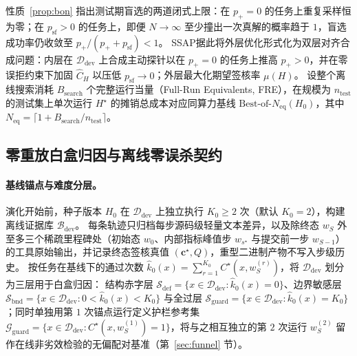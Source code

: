 \documentclass[UTF8,a4paper,10.5pt]{ctexart}
\newcommand{\method}{SSAP}
\newcommand{\Ddev}{\mathcal{D}_{\mathrm{dev}}}
\begin{document}
性质~\ref{prop:bon} 指出测试期盲选的两道闭式上限：在 $p_+=0$ 的任务上重复采样恒为零；在 $p_{\mathrm{sf}}>0$ 的任务上，即便 $N\to\infty$ 至少撞出一次真解的概率趋于 $1$，盲选成功率仍收敛至 $p_+/(p_++p_{\mathrm{sf}})<1$。
\method{}据此将外层优化形式化为双层对齐合成问题：内层在 $\Ddev$ 上合成主动探针以在 $p_+=0$ 的任务上推高 $p_+>0$，并在零误拒约束下加固 $\hat{C}_H$ 以压低 $p_{\mathrm{sf}}\to 0$；外层最大化期望签核率 $\mu(H)$。
设整个离线搜索消耗 $B_{\mathrm{search}}$ 个完整运行当量（Full-Run Equivalents, FRE），在规模为 $n_{\mathrm{test}}$ 的测试集上单次运行 $H^\star$ 的摊销总成本对应同算力基线 $\text{Best-of-}N_{\mathrm{eq}}(H_0)$，其中 $N_{\mathrm{eq}}=\lceil 1 + B_{\mathrm{search}}/n_{\mathrm{test}}\rceil$。

\subsection{零重放白盒归因与离线零误杀契约}
\label{sec:attribution}

\paragraph{基线锚点与难度分层。}
演化开始前，种子版本 $H_0$ 在 $\Ddev$ 上独立执行 $K_0\ge 2$ 次（默认 $K_0=2$），构建离线证据库 $\mathcal{B}_{\mathrm{dev}}$。
每条轨迹只归档每步源码级轻量文本差异，以及除终态 $w_S$ 外至多三个稀疏里程碑处（初始态 $w_0$、内部指标峰值步 $w_{s^\star}$ 与提交前一步 $w_{S-1}$）的工具原始输出，并记录终态签核真值 $(\mathbf{c}^\star, Q)$，重型二进制产物不写入步级历史。
按任务在基线下的通过次数 $\hat{k}_0(x)=\sum_{r=1}^{K_0} C^\star(x, w^{(r)}_S)$，将 $\Ddev$ 划分为三层用于白盒归因：
结构赤字层 $\mathcal{S}_{\mathrm{def}}=\{x\in\Ddev:\hat{k}_0(x)=0\}$、边界敏感层 $\mathcal{S}_{\mathrm{bnd}}=\{x\in\Ddev:0<\hat{k}_0(x)<K_0\}$ 与全过层 $\mathcal{S}_{\mathrm{guard}}=\{x\in\Ddev:\hat{k}_0(x)=K_0\}$；同时单独用第 $1$ 次锚点运行定义护栏参考集 $\mathcal{G}_{\mathrm{guard}}=\{x\in\Ddev:C^\star(x,w^{(1)}_S)=1\}$，将与之相互独立的第 $2$ 次运行 $w^{(2)}_S$ 留作在线非劣效检验的无偏配对基准（第~\ref{sec:funnel} 节）。
\end{document}

